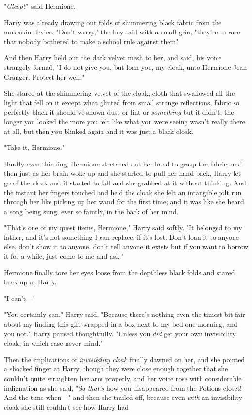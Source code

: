 "\emph{Gleep?}" said Hermione.

Harry was already drawing out folds of shimmering black fabric from the
mokeskin device. "Don't worry," the boy said with a small grin, "they're so
rare that nobody bothered to make a school rule against them{\el}"

And then Harry held out the dark velvet mesh to her, and said, his voice
strangely formal, "I do not give you, but loan you, my cloak, unto Hermione
Jean Granger. Protect her well."

She stared at the shimmering velvet of the cloak, cloth that swallowed all the
light that fell on it except what glinted from small strange reflections,
fabric so perfectly black it should've shown dust or lint or \emph{something}
but it didn't, the longer you looked the more you felt like what you were
seeing wasn't really there at all, but then you blinked again and it was just a
black cloak.

"Take it, Hermione."

Hardly even thinking, Hermione stretched out her hand to grasp the fabric; and
then just as her brain woke up and she started to pull her hand back, Harry let
go of the cloak and it started to fall and she grabbed at it without thinking.
And the instant her fingers touched and held the cloak she felt an intangible
jolt run through her like picking up her wand for the first time; and it was
like she heard a song being sung, ever so faintly, in the back of her mind.

"That's one of my quest items, Hermione," Harry said softly. "It belonged to my
father, and it's not something I can replace, if it's lost. Don't loan it to
anyone else, don't show it to anyone, don't tell anyone it exists{\el} but
if you want to borrow it for a while, just come to me and ask."

Hermione finally tore her eyes loose from the depthless black folds and stared
back up at Harry.

"I can't\mbox{---}"

"You certainly can," Harry said. "Because there's nothing even the tiniest bit
fair about my finding this gift-wrapped in a box next to my bed one morning,
and you{\el} not." Harry paused thoughtfully. "Unless you \emph{did} get
your own invisibility cloak, in which case never mind."

Then the implications of \emph{invisibility cloak} finally dawned on her, and
she pointed a shocked finger at Harry, though they were close enough together
that she couldn't quite straighten her arm properly, and her voice rose with
considerable indignation as she said, "So \emph{that's} how you disappeared
from the Potions closet! And the time when\mbox{---}" and then she trailed off,
because even \emph{with} an invisibility cloak she still couldn't see how Harry
had{\el}

